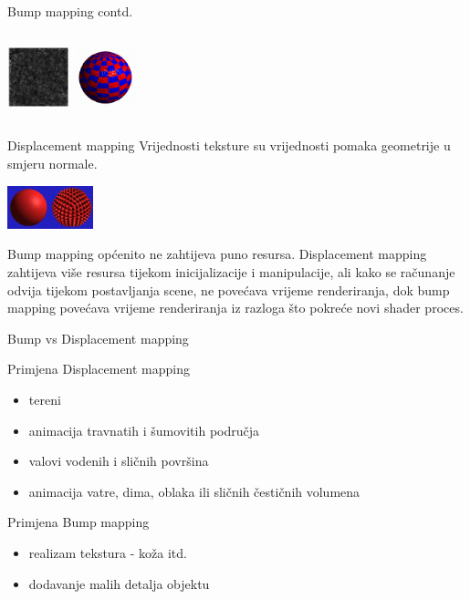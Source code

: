 \documentclass[9pt]{beamer}
\begin{document}
\begin{frame}{Bump mapping contd.}
\begin{columns}[t]
\begin{column}{5cm}
\begin{center}
				\includegraphics[width=1.8cm]{slike/bump_02_02.png}
				\includegraphics[width=1.8cm]{slike/bump_03_03.png}
			\end{center}
		\end{column}
	\end{columns}
\end{frame}
%
\begin{frame}{Displacement mapping}
	Vrijednosti teksture su vrijednosti pomaka geometrije u smjeru normale.
	\begin{center}
		\includegraphics[width=2.5cm]{slike/displacement_map.png}
	\end{center}
	\begin{block}{}
		Bump mapping općenito ne zahtijeva puno resursa. Displacement mapping zahtijeva više resursa tijekom
		inicijalizacije i manipulacije, ali kako se računanje odvija tijekom postavljanja scene, ne povećava vrijeme renderiranja, dok bump mapping povećava vrijeme renderiranja iz razloga što pokreće novi shader proces.
	\end{block}
	
	
\end{frame}
%
\begin{frame}{Bump vs Displacement mapping}
	\begin{block}{Primjena Displacement mapping}
		\begin{itemize}
			\item tereni
			\item animacija travnatih i šumovitih područja
			\item valovi vodenih i sličnih površina
			\item animacija vatre, dima, oblaka ili sličnih čestičnih volumena
		\end{itemize}
	\end{block}
	
	\begin{block}{Primjena Bump mapping}
		\begin{itemize}
			\item realizam tekstura - koža itd.
			\item dodavanje malih detalja objektu
		\end{itemize}
	\end{block}
\end{frame}
\end{document}
